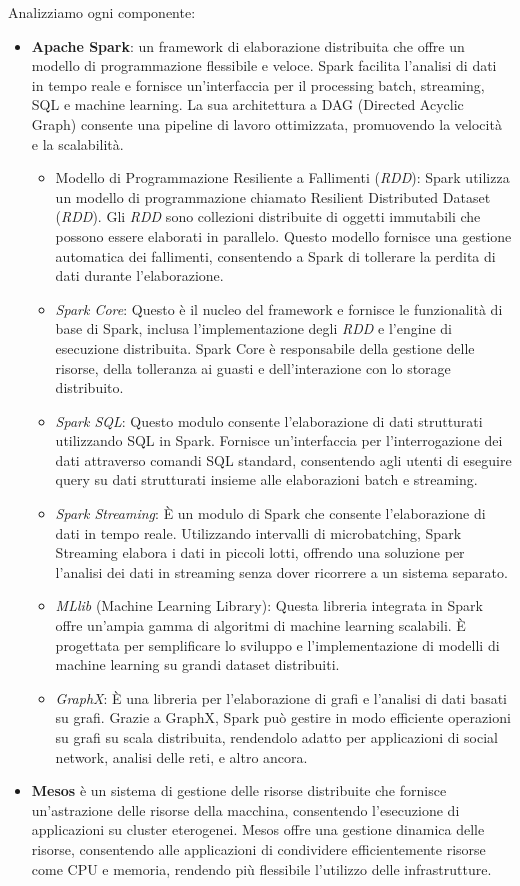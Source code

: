 Analizziamo ogni componente:
\begin{itemize}
    \item \textbf{Apache Spark}: un framework di elaborazione distribuita che offre un modello di programmazione flessibile e veloce. 
    Spark facilita l'analisi di dati in tempo reale e fornisce un'interfaccia per il processing batch, streaming, SQL e machine learning. 
    La sua architettura a DAG (Directed Acyclic Graph) consente una pipeline di lavoro ottimizzata, promuovendo la velocità e la scalabilità.
    \begin{itemize}
        \item Modello di Programmazione Resiliente a Fallimenti (\textit{RDD}): Spark utilizza un modello di programmazione chiamato Resilient Distributed Dataset (\textit{RDD}). Gli \textit{RDD} sono collezioni distribuite di oggetti immutabili che possono essere elaborati in parallelo. Questo modello fornisce una gestione automatica dei fallimenti, consentendo a Spark di tollerare la perdita di dati durante l'elaborazione.
        \item \textit{Spark Core}: Questo è il nucleo del framework e fornisce le funzionalità di base di Spark, inclusa l'implementazione degli \textit{RDD} e l'engine di esecuzione distribuita. Spark Core è responsabile della gestione delle risorse, della tolleranza ai guasti e dell'interazione con lo storage distribuito.
        \item \textit{Spark SQL}: Questo modulo consente l'elaborazione di dati strutturati utilizzando SQL in Spark. Fornisce un'interfaccia per l'interrogazione dei dati attraverso comandi SQL standard, consentendo agli utenti di eseguire query su dati strutturati insieme alle elaborazioni batch e streaming.
        \item \textit{Spark Streaming}: È un modulo di Spark che consente l'elaborazione di dati in tempo reale. Utilizzando intervalli di microbatching, Spark Streaming elabora i dati in piccoli lotti, offrendo una soluzione per l'analisi dei dati in streaming senza dover ricorrere a un sistema separato.
        \item \textit{MLlib} (Machine Learning Library): Questa libreria integrata in Spark offre un'ampia gamma di algoritmi di machine learning scalabili. È progettata per semplificare lo sviluppo e l'implementazione di modelli di machine learning su grandi dataset distribuiti.
        \item \textit{GraphX}: È una libreria per l'elaborazione di grafi e l'analisi di dati basati su grafi. Grazie a GraphX, Spark può gestire in modo efficiente operazioni su grafi su scala distribuita, rendendolo adatto per applicazioni di social network, analisi delle reti, e altro ancora.
    \end{itemize}
    \item \textbf{Mesos} è un sistema di gestione delle risorse distribuite che fornisce un'astrazione delle risorse della macchina, consentendo l'esecuzione di applicazioni su cluster eterogenei. Mesos offre una gestione dinamica delle risorse, consentendo alle applicazioni di condividere efficientemente risorse come CPU e memoria, rendendo più flessibile l'utilizzo delle infrastrutture.
    

\end{itemize}
